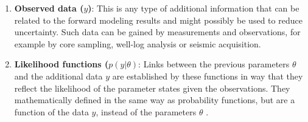 \begin{enumerate}
        	\item \textbf{Observed data ($y$)}: This is any type of additional information that can be related to the forward modeling results and might possibly be used to reduce uncertainty. Such data can be gained by measurements and observations, for example by core sampling, well-log analysis or seismic acquisition. 
        	\item \textbf{Likelihood functions ($p(y|\theta)$}: Links between the previous parameters $\theta$ and the additional data $y$ are established by these functions in way that they reflect the likelihood of the parameter states given the observations. They mathematically defined in the same way as probability functions, but are a function of the data $y$, instead of the parameters $\theta$ \citep{delaVarga2016}.
        \end{enumerate}
        
